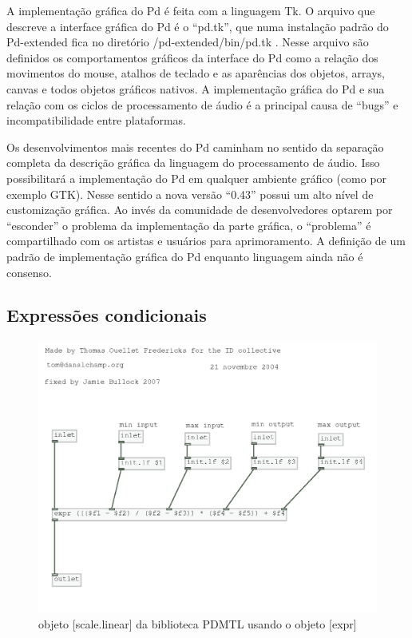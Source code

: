\documentclass{ppgmus}
\begin{document}
A implementação gráfica do Pd é feita com a linguagem Tk. O arquivo
que descreve a interface gráfica do Pd é o ``pd.tk'', que numa instalação
padrão do Pd-extended fica no diretório /pd-extended/bin/pd.tk .
Nesse arquivo são definidos os comportamentos gráficos da interface do Pd como
a relação dos movimentos do mouse, atalhos de teclado e as aparências dos
objetos, arrays, canvas e todos objetos gráficos nativos.
A implementação gráfica do Pd e sua relação com os ciclos de processamento
de áudio é a principal causa de ``bugs'' e incompatibilidade entre plataformas.

Os desenvolvimentos mais recentes do Pd caminham no sentido da separação
completa da descrição gráfica da linguagem do processamento de áudio. 
Isso possibilitará a implementação do Pd em qualquer ambiente gráfico (como
por exemplo GTK).
Nesse sentido a nova versão ``0.43'' possui um alto nível de customização gráfica.
Ao invés da comunidade de desenvolvedores optarem por ``esconder'' o problema
da implementação da parte gráfica, o ``problema'' é compartilhado com os
artistas e usuários para aprimoramento. A definição de um padrão de implementação
gráfica do Pd enquanto linguagem ainda não é consenso.

\subsection{Expressões condicionais}

\begin{figure}
\includegraphics[scale=.6]{escale-pdmtl}
\caption{objeto [scale.linear] da biblioteca PDMTL usando o objeto [expr]}
\label{escale-linear}
\end{figure}
\end{document}

